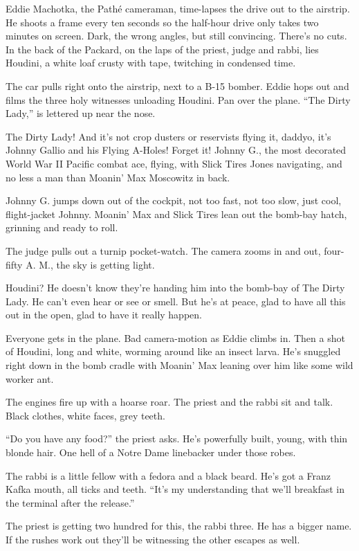 Eddie Machotka, the Pathé cameraman, time-lapses the drive out to the airstrip. He shoots a frame every ten seconds so the half-hour drive only takes two minutes on screen. Dark, the wrong angles, but still convincing. There's no cuts. In the back of the Packard, on the laps of the priest, judge and rabbi, lies Houdini, a white loaf crusty with tape, twitching in condensed time.

The car pulls right onto the airstrip, next to a B-15 bomber. Eddie hops out and films the three holy witnesses unloading Houdini. Pan over the plane. ``The Dirty Lady,'' is lettered up near the nose.

The Dirty Lady! And it's not crop dusters or reservists flying it, daddyo, it's Johnny Gallio and his Flying A-Holes! Forget it! Johnny G., the most decorated World War II Pacific combat ace, flying, with Slick Tires Jones navigating, and no less a man than Moanin' Max Moscowitz in back.

Johnny G. jumps down out of the cockpit, not too fast, not too slow, just cool, flight-jacket Johnny. Moanin' Max and Slick Tires lean out the bomb-bay hatch, grinning and ready to roll.

The judge pulls out a turnip pocket-watch. The camera zooms in and out, four-fifty A. M., the sky is getting light.

Houdini? He doesn't know they're handing him into the bomb-bay of The Dirty Lady. He can't even hear or see or smell. But he's at peace, glad to have all this out in the open, glad to have it really happen.

Everyone gets in the plane. Bad camera-motion as Eddie climbs in. Then a shot of Houdini, long and white, worming around like an insect larva. He's snuggled right down in the bomb cradle with Moanin' Max leaning over him like some wild worker ant.

The engines fire up with a hoarse roar. The priest and the rabbi sit and talk. Black clothes, white faces, grey teeth.

``Do you have any food?'' the priest asks. He's powerfully built, young, with thin blonde hair. One hell of a Notre Dame linebacker under those robes.

The rabbi is a little fellow with a fedora and a black beard. He's got a Franz Kafka mouth, all ticks and teeth. ``It's my understanding that we'll breakfast in the terminal after the release.''

The priest is getting two hundred for this, the rabbi three. He has a bigger name. If the rushes work out they'll be witnessing the other escapes as well.

